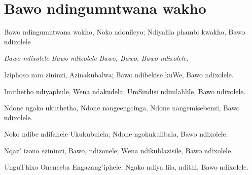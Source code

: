 \starttocol
\chapter{Bawo ndingumntwana wakho}
\nexttocol
\hfill{\it }
\stoptocol
\starttocol
\startlines
{\sc Bawo} ndingumntwana wakho, 
Noko ndonileyo; 
Ndiyalila phambi kwakho, 
Bawo ndixolele 

{\it Bawo ndixolele 
Bawo ndixolcle
Bawo, Bawo, Bawo ndixolele.}

Iziphoso zam zininzi, 
Azinakubalwa; 
Bawo ndibekise kuWe, 
Bawo ndixolele.

Imithetho ndiyaphule,
Wena ndakudela; 
UmSindisi ndimlahlile, 
Bawo ndixolele.

Ndone ngako ukuthetha, 
Ndone nangeengcinga, 
Ndone nangemisebenzi, 
Bawo ndixolele.
 
Noko ndibe ndifanele
Ukukubulela; 
Ndone ngokukulibala, 
Bawo ndixolele.

Nqaz' izono ezininzi,
Bawo, ndizonele;
Wena ndikuhlazisile,
Bawo ndixolele.

UnguThixo Onenceba
Engazang'iphele;
Ngako ndiya lila, ndithi,
Bawo ndixolele.
\stoplines
\nexttocol

\stoptocol
